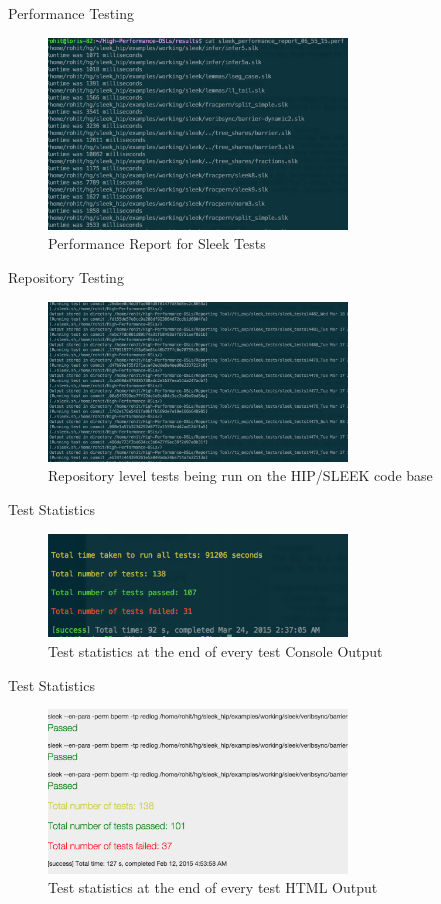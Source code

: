 \begin{frame}{Performance Testing}
\begin{figure}[H]
  \centering
    \includegraphics[width=300px]{figures/performance_testing.png}
  \caption{Performance Report for Sleek Tests}
\end{figure}
\end{frame}

\begin{frame}{Repository Testing}
\begin{figure}[H]
  \centering
    \includegraphics[width=300px]{figures/repo_testing.png}
  \caption{Repository level tests being run on the HIP/SLEEK code base}
\end{figure}
\end{frame}


\begin{frame}{Test Statistics}
\begin{figure}[H]
  \centering
    \includegraphics[width=300px]{figures/test_statistics.png}
  \caption{Test statistics at the end of every test Console Output}
\end{figure}
\end{frame}

\begin{frame}{Test Statistics}
\begin{figure}[H]
  \centering
    \includegraphics[width=300px]{figures/web_output_2.png}
  \caption{Test statistics at the end of every test HTML Output}
\end{figure}
\end{frame}

